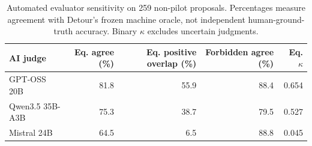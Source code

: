 \begin{table}[t]
\centering\footnotesize
\caption{Automated evaluator sensitivity on 259 non-pilot proposals. Percentages measure agreement with Detour's frozen machine oracle, not independent human-ground-truth accuracy. Binary $\kappa$ excludes uncertain judgments.}
\label{tab:ai_judge_sensitivity}
\begin{tabular}{@{}lrrrr@{}}
\toprule
AI judge & Eq. agree (\%) & Eq. positive overlap (\%) & Forbidden agree (\%) & Eq. $\kappa$ \\
\midrule
GPT-OSS 20B & 81.8 & 55.9 & 88.4 & 0.654 \\
Qwen3.5 35B-A3B & 75.3 & 38.7 & 79.5 & 0.527 \\
Mistral 24B & 64.5 & 6.5 & 88.8 & 0.045 \\
\bottomrule
\end{tabular}
\end{table}
